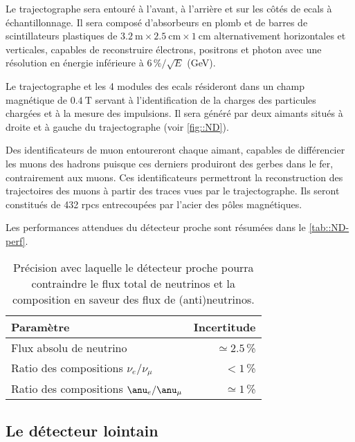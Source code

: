       Le trajectographe sera entouré à l'avant, à l'arrière et sur les côtés de \glspl{ecal} à échantillonnage. Il sera composé d'absorbeurs en plomb et de barres de scintillateurs plastiques de $\SI{3.2}{\meter}\times\SI{2.5}{\centi\meter}\times\SI{1}{\centi\meter}$ alternativement horizontales et verticales, capables de reconstruire électrons, positrons et photon avec une résolution en énergie inférieure à $6\,\%/\sqrt{E}$ (\si{\giga\electronvolt})\cite{Bhuyan2017}. 

      Le trajectographe et les 4 modules des \glspl{ecal} résideront dans un champ magnétique de $\SI{0.4}{\tesla}$ servant à l'identification de la charges des particules chargées et à la mesure des impulsions. Il sera généré par deux aimants situés à droite et à gauche du trajectographe (voir \autoref{fig::ND}). 

      Des identificateurs de muon entoureront chaque aimant, capables de différencier les muons des hadrons puisque ces derniers produiront des gerbes dans le fer, contrairement aux muons. Ces identificateurs permettront la reconstruction des trajectoires des muons à partir des traces vues par le trajectographe. Ils seront constitués de 432 \glspl{rpc} entrecoupées par l'acier des pôles magnétiques. 

      Les performances attendues du détecteur proche sont résumées dans le \autoref{tab::ND-perf}.

      \begin{table}[htpb]
        \centering
        \begin{tabular}{|lr|}
          \hline
          \textbf{Paramètre}                         & \textbf{Incertitude} \\ \hline
          Flux absolu de neutrino  & $\simeq 2.5$\,\%   \\
          Ratio des compositions $\nu_e/\nu_{\mu}$          & $< 1$\,\%        \\
          Ratio des compositions $\anu_e/\anu_{\mu}$      & $\simeq 1$\,\%     \\ \hline
        \end{tabular}
        \caption[Précision du détecteur proche]{\label{tab::ND-perf}Précision avec laquelle le détecteur proche pourra contraindre le flux total de neutrinos et la composition en saveur des flux de (anti)neutrinos.}
      \end{table}

      \subsection{Le détecteur lointain}\label{sec::far_detector}

